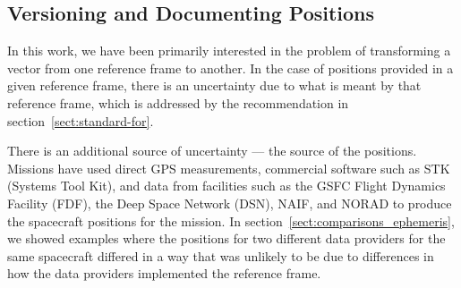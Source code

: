 \documentclass[draft]{agujournal2019}
\begin{document}








\subsection{Versioning and Documenting Positions}
\label{sect:ephemeris-version}

In this work, we have been primarily interested in the problem of transforming a vector from one reference frame to another. In the case of positions provided in a given reference frame, there is an uncertainty due to what is meant by that reference frame, which is addressed by the recommendation in section~\ref{sect:standard-for}.

There is an additional source of uncertainty --- the source of the positions. Missions have used direct GPS measurements, commercial software such as STK (Systems Tool Kit), and data from facilities such as the GSFC Flight Dynamics Facility (FDF), the Deep Space Network (DSN), NAIF, and NORAD to produce the spacecraft positions for the mission.  In section~\ref{sect:comparisons_ephemeris}, we showed examples where the positions for two different data providers for the same spacecraft differed in a way that was unlikely to be due to differences in how the data providers implemented the reference frame. 

\end{document}
